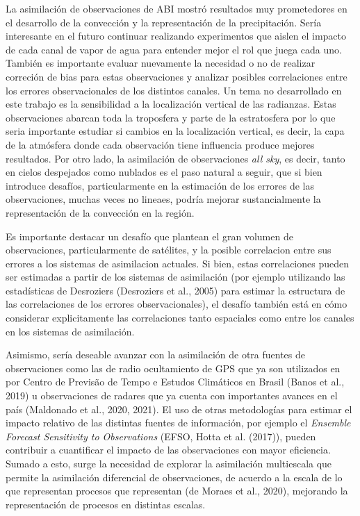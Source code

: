 \documentclass[12pt,oneside,a4paper]{reedthesis}
\begin{document}
La asimilación de observaciones de ABI mostró resultados muy prometedores en el desarrollo de la convección y la representación de la precipitación. Sería interesante en el futuro continuar realizando experimentos que aislen el impacto de cada canal de vapor de agua para entender mejor el rol que juega cada uno. También es importante evaluar nuevamente la necesidad o no de realizar correción de bias para estas observaciones y analizar posibles correlaciones entre los errores observacionales de los distintos canales. Un tema no desarrollado en este trabajo es la sensibilidad a la localización vertical de las radianzas. Estas observaciones abarcan toda la troposfera y parte de la estratosfera por lo que seria importante estudiar si cambios en la localización vertical, es decir, la capa de la atmósfera donde cada observación tiene influencia produce mejores resultados. Por otro lado, la asimilación de observaciones \emph{all sky}, es decir, tanto en cielos despejados como nublados es el paso natural a seguir, que si bien introduce desafíos, particularmente en la estimación de los errores de las observaciones, muchas veces no lineaes, podría mejorar sustancialmente la representación de la convección en la región.

Es importante destacar un desafío que plantean el gran volumen de observaciones, particularmente de satélites, y la posible correlacion entre sus errores a los sistemas de asimilacion actuales. Si bien, estas correlaciones pueden ser estimadas a partir de los sistemas de asimilación (por ejemplo utilizando las estadísticas de Desroziers (Desroziers et al., 2005) para estimar la estructura de las correlaciones de los errores observacionales), el desafío también está en cómo considerar explicitamente las correlaciones tanto espaciales como entre los canales en los sistemas de asimilación.

Asimismo, sería deseable avanzar con la asimilación de otra fuentes de observaciones como las de radio ocultamiento de GPS que ya son utilizados en por Centro de Previsão de Tempo e Estudos Climáticos en Brasil (Banos et al., 2019) u observaciones de radares que ya cuenta con importantes avances en el país (Maldonado et al., 2020, 2021). El uso de otras metodologías para estimar el impacto relativo de las distintas fuentes de información, por ejemplo el \emph{Ensemble Forecast Sensitivity to Observations} (EFSO, Hotta et al. (2017)), pueden contribuir a cuantificar el impacto de las observaciones con mayor eficiencia. Sumado a esto, surge la necesidad de explorar la asimilación multiescala que permite la asimilación diferencial de observaciones, de acuerdo a la escala de lo que representan procesos que representan (de Moraes et al., 2020), mejorando la representación de procesos en distintas escalas.
\end{document}
